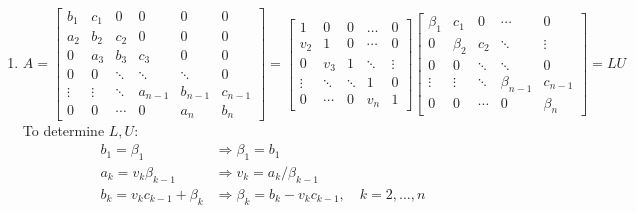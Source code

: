 \documentclass[english,onecolumn]{IEEEtran}
\begin{document}
\begin{enumerate}
    \item 
$$A=\left[\begin{array}{cccccc}
b_{1} & c_{1} & 0 & 0 & 0 & 0 \\
a_{2} & b_{2} & c_{2} & 0 & 0 & 0 \\
0 & a_{3} & b_{3} & c_{3} & 0 & 0 \\
0 & 0 & \ddots & \ddots & \ddots & 0 \\
\vdots & \vdots & \ddots & a_{n-1} & b_{n-1} & c_{n-1} \\
0 & 0 & \cdots & 0 & a_{n} & b_{n}
\end{array}\right]=\left[\begin{array}{ccccc}
1 & 0 & 0 & \ldots & 0 \\
v_{2} & 1 & 0 & \cdots & 0 \\
0 & v_{3} & 1 & \ddots & \vdots \\
\vdots & \ddots & \ddots & 1 & 0 \\
0 & \cdots & 0 & v_{n} & 1
\end{array}\right]\left[\begin{array}{ccccc}
\beta_{1} & c_{1} & 0 & \cdots & 0 \\
0 & \beta_{2} & c_{2} & \ddots & \vdots \\
0 & 0 & \ddots & \ddots & 0 \\
\vdots & \vdots & \ddots & \beta_{n-1} & c_{n-1} \\
0 & 0 & \cdots & 0 & \beta_{n}
\end{array}\right]=L U
$$
To determine $L, U:$
$$
\begin{aligned}
b_{1}=\beta_{1} & \Rightarrow \beta_{1}=b_{1} \\
a_{k}=v_{k} \beta_{k-1} & \Rightarrow v_{k}=a_{k} / \beta_{k-1} \\
b_{k}=v_{k} c_{k-1}+\beta_{k} & \Rightarrow \beta_{k}=b_{k}-v_{k} c_{k-1}, \quad k=2, \ldots, n
\end{aligned}
$$



\end{enumerate}
\end{document}
